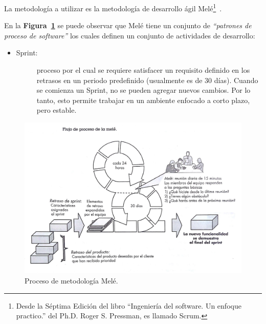La metodología a utilizar es la metodología de desarrollo ágil Melé\footnote{Desde la Séptima Edición del libro ``Ingeniería del software. Un enfoque practico.'' del Ph.D. Roger S. Pressman, es llamado Scrum. }~\cite{7}.

En la \textbf{Figura~\ref{fig: procesoMele}} se puede observar que Melé tiene un conjunto de \emph{``patrones de proceso de software''} los cuales definen un conjunto de actividades de desarrollo:

\begin{itemize}
    

    \item   \begin{description}
                \item[Sprint:] proceso por el cual se requiere satisfacer un requisito definido en los retrasos en un periodo predefinido (usualmente es de 30 días). Cuando se comienza un Sprint, no se pueden agregar nuevos cambios. Por lo tanto, esto permite trabajar en un ambiente enfocado a corto plazo, pero estable.
            \end{description}

    

    
\end{itemize}

\begin{figure}[h!]
    \includegraphics[width=\textwidth]{Imagenes/mele.jpg}
    \caption{\label{fig: procesoMele} Proceso de metodología Melé.}
\end{figure}
